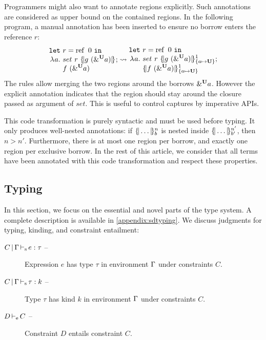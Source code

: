 Programmers might also want to annotate regions explicitly.
Such annotations are considered as
upper bound on the contained regions.
In the following program, a manual annotation has been inserted to ensure
no borrow enters the reference $r$:
%
\[
  \setlength{\jot}{-1pt}
  \RannotT{
\begin{aligned}
  \letin{&r}{\operatorname{ref}\ 0}{}\\
  \lam{a}{}\ &
  set\ r\ \region[]{}{g\ (\borrow[\kun]{a})};\\
  &f\ (\borrow[\kun]{a})
\end{aligned}
}{
\begin{aligned}
  \letin{&r}{\operatorname{ref}\ 0}{}\\
  \lam{a}{}\ &
  set\ r\ \region[1]{\Sone a\IBORROW}{g\ (\borrow[\kun]{a})};\\
  &\region[1]{\Sone a\IBORROW}{f\ (\borrow[\kun]{a})}
\end{aligned}
}
\]
%
The rules allow merging the two regions around the borrows
$\borrow[\kun]{a}$. However
the explicit annotation indicates that the region should stay around the closure
passed as argument of $set$. This is useful to control captures
by imperative APIs.

This code transformation is purely syntactic and must be used before
typing. It only produces well-nested annotations: if $\region[n]{b}{\dots}$
is nested inside $\region[n']{b'}{\dots}$, then $n > n'$. Furthermore, there
is at most one region per borrow, and exactly one region per exclusive borrow.
In the rest of this article, we consider
that all terms have been annotated with this code transformation and respect
these properties.

\subsection{Typing}
\label{sdtyping}

In this section, we focus on the essential and novel parts of the type system. A complete
description is available in \cref{appendix:sdtyping}.
%
We discuss judgments for typing, kinding, and constraint entailment:
\begin{description}
\item[$\inferS{C}{\E}{e}{\tau}$ --]
  Expression $e$ has type $\tau$ in environment $\E$ under constraints $C$.
\item[$\inferSK{C}{\E}{\tau}{k}$ --]
  Type $\tau$ has kind $k$ in environment $\E$ under constraints $C$.
\item[$\entail{D}{C}$ --] Constraint $D$ entails constraint $C$.
\end{description}

